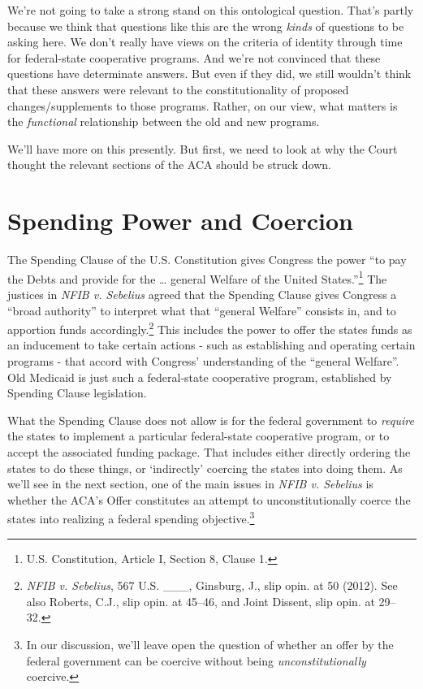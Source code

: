\documentclass[
  11pt,
  letterpaper,
  DIV=11,
  numbers=noendperiod,
  twoside]{scrartcl}
\begin{document}
We're not going to take a strong stand on this ontological question.
That's partly because we think that questions like this are the wrong
\emph{kinds} of questions to be asking here. We don't really have views
on the criteria of identity through time for federal-state cooperative
programs. And we're not convinced that these questions have determinate
answers. But even if they did, we still wouldn't think that these
answers were relevant to the constitutionality of proposed
changes/supplements to those programs. Rather, on our view, what matters
is the \emph{functional} relationship between the old and new programs.

We'll have more on this presently. But first, we need to look at why the
Court thought the relevant sections of the ACA should be struck down.

\section{Spending Power and Coercion}\label{spending-power-and-coercion}

The Spending Clause of the U.S. Constitution gives Congress the power
``to pay the Debts and provide for the \ldots{} general Welfare of the
United States.''\footnote{U.S. Constitution, Article I, Section 8,
  Clause 1.} The justices in \emph{NFIB v. Sebelius} agreed that the
Spending Clause gives Congress a ``broad authority'' to interpret what
that ``general Welfare'' consists in, and to apportion funds
accordingly.\footnote{\emph{NFIB v. Sebelius}, 567 U.S. \_\_\_,
  Ginsburg, J., slip opin. at 50 (2012). See also Roberts, C.J., slip
  opin. at 45--46, and Joint Dissent, slip opin. at 29--32.} This
includes the power to offer the states funds as an inducement to take
certain actions - such as establishing and operating certain programs -
that accord with Congress' understanding of the ``general Welfare''. Old
Medicaid is just such a federal-state cooperative program, established
by Spending Clause legislation.

What the Spending Clause does not allow is for the federal government to
\emph{require} the states to implement a particular federal-state
cooperative program, or to accept the associated funding package. That
includes either directly ordering the states to do these things, or
`indirectly' coercing the states into doing them. As we'll see in the
next section, one of the main issues in \emph{NFIB v. Sebelius} is
whether the ACA's Offer constitutes an attempt to unconstitutionally
coerce the states into realizing a federal spending
objective.\footnote{In our discussion, we'll leave open the question of
  whether an offer by the federal government can be coercive without
  being \emph{unconstitutionally} coercive.}
\end{document}
